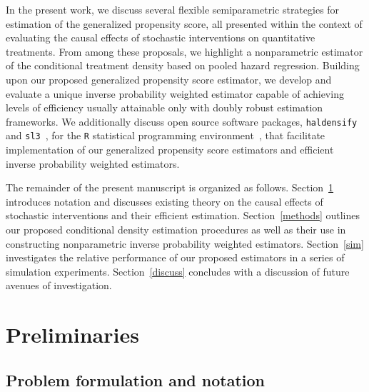 In the present work, we discuss several flexible semiparametric strategies for
estimation of the generalized propensity score, all presented within the context
of evaluating the causal effects of stochastic interventions on quantitative
treatments. From among these proposals, we highlight a nonparametric estimator
of the conditional treatment density based on pooled hazard regression. Building
upon our proposed generalized propensity score estimator, we develop and
evaluate a unique inverse probability weighted estimator capable of achieving
levels of efficiency usually attainable only with doubly robust estimation
frameworks. We additionally discuss open source software packages,
\texttt{haldensify}~\citep{hejazi2020haldensify} and
\texttt{sl3}~\citep{coyle2020sl3}, for the \texttt{R} statistical programming
environment~\citep{R}, that facilitate implementation of our generalized
propensity score estimators and efficient inverse probability weighted
estimators.

The remainder of the present manuscript is organized as follows.
Section~\ref{prelim} introduces notation and discusses existing theory on the
causal effects of stochastic interventions and their efficient estimation.
Section~\ref{methods} outlines our proposed conditional density estimation
procedures as well as their use in constructing nonparametric inverse
probability weighted estimators. Section~\ref{sim} investigates the relative
performance of our proposed estimators in a series of simulation experiments.
Section~\ref{discuss} concludes with a discussion of future avenues of
investigation.

\section{Preliminaries}\label{prelim}

\subsection{Problem formulation and notation}\label{setup}

